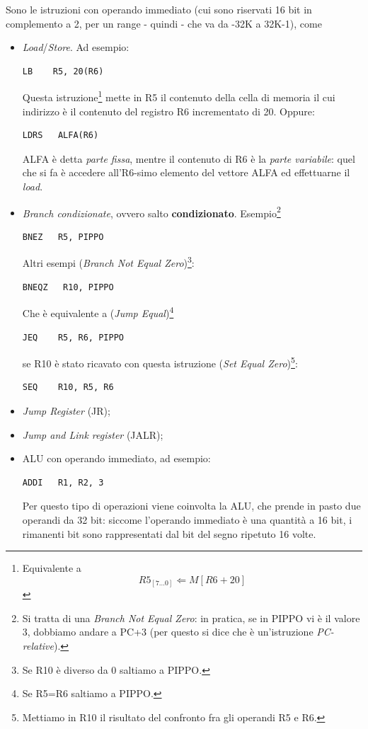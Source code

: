 Sono le istruzioni con operando immediato (cui sono riservati 16 bit in complemento a 2, per un range - quindi - che va da -32K a 32K-1), come
\begin{itemize}
\item \textit{Load}/\textit{Store}. Ad esempio:
\begin{verbatim}
LB    R5, 20(R6)
\end{verbatim}
Questa istruzione\footnote{Equivalente a 
\[
R5_{[7\ldots 0]} \Leftarrow M[R6+20]
\]} mette in R5 il contenuto della cella di memoria il cui indirizzo è il contenuto del registro R6 incrementato di 20.
Oppure:
\begin{verbatim}
LDRS   ALFA(R6)
\end{verbatim}
ALFA è detta \textit{parte fissa}, mentre il contenuto di R6 è la \textit{parte variabile}: quel che si fa è accedere all'R6-simo elemento del vettore ALFA ed effettuarne il \textit{load}.
\item \textit{Branch condizionate}, ovvero salto \textbf{condizionato}. Esempio\footnote{Si tratta di una \textit{Branch Not Equal Zero}: in pratica, se in PIPPO vi è il valore 3, dobbiamo andare a PC+3 (per questo si dice che è un'istruzione \textit{PC-relative}).}
\begin{verbatim}
BNEZ   R5, PIPPO
\end{verbatim}
Altri esempi (\textit{Branch Not Equal Zero})\footnote{Se R10 è diverso da 0 saltiamo a PIPPO.}:
\begin{verbatim}
BNEQZ   R10, PIPPO
\end{verbatim}
Che è equivalente a (\textit{Jump Equal})\footnote{Se R5=R6 saltiamo a PIPPO.}
\begin{verbatim}
JEQ    R5, R6, PIPPO
\end{verbatim}
se R10 è stato ricavato con questa istruzione (\textit{Set Equal Zero})\footnote{Mettiamo in R10 il risultato del confronto fra gli operandi R5 e R6.}:
\begin{verbatim}
SEQ    R10, R5, R6
\end{verbatim}

\item \textit{Jump Register} (JR);
\item \textit{Jump and Link register} (JALR);
\item ALU con operando immediato, ad esempio:
\begin{verbatim}
ADDI   R1, R2, 3
\end{verbatim}
Per questo tipo di operazioni viene coinvolta la ALU, che prende in pasto due operandi da 32 bit: siccome l'operando immediato è una quantità a 16 bit, i rimanenti bit sono rappresentati dal bit del segno ripetuto 16 volte.
\end{itemize}

